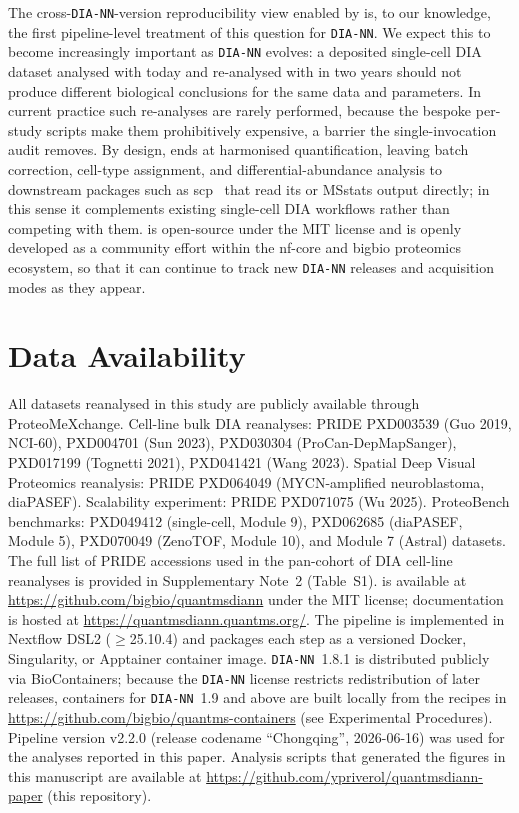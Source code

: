 \documentclass[preprint,12pt]{elsarticle}
\begin{document}
The cross-\texttt{DIA-NN}-version reproducibility view enabled by \quantmsdiann{} is, to our knowledge, the first pipeline-level treatment of this question for \texttt{DIA-NN}. We expect this to become increasingly important as \texttt{DIA-NN} evolves: a deposited single-cell DIA dataset analysed with  today and re-analysed with  in two years should not produce different biological conclusions for the same data and parameters. In current practice such re-analyses are rarely performed, because the bespoke per-study scripts make them prohibitively expensive, a barrier the single-invocation audit removes. By design, \quantmsdiann{} ends at harmonised quantification, leaving batch correction, cell-type assignment, and differential-abundance analysis to downstream packages such as scp~\cite{vanderaa2023} that read its \qpx{} or MSstats output directly; in this sense it complements existing single-cell DIA workflows rather than competing with them. \quantmsdiann{} is open-source under the MIT license and is openly developed as a community effort within the nf-core and bigbio proteomics ecosystem, so that it can continue to track new \texttt{DIA-NN} releases and acquisition modes as they appear.


\section*{Data Availability}
All datasets reanalysed in this study are publicly available through ProteoMeXchange.
Cell-line bulk DIA reanalyses: PRIDE PXD003539 (Guo 2019, NCI-60), PXD004701 (Sun 2023), PXD030304 (ProCan-DepMapSanger), PXD017199 (Tognetti 2021), PXD041421 (Wang 2023). Spatial Deep Visual Proteomics reanalysis: PRIDE PXD064049 (MYCN-amplified neuroblastoma, diaPASEF).
Scalability experiment: PRIDE PXD071075 (Wu 2025). ProteoBench benchmarks: PXD049412 (single-cell, Module 9), PXD062685 (diaPASEF, Module 5), PXD070049 (ZenoTOF, Module 10), and Module 7 (Astral) datasets. The full list of PRIDE accessions used in the pan-cohort of DIA cell-line reanalyses is provided in Supplementary Note~2 (Table~S1). \quantmsdiann{} is available at \url{https://github.com/bigbio/quantmsdiann} under the MIT license; documentation is hosted at \url{https://quantmsdiann.quantms.org/}.
The pipeline is implemented in Nextflow DSL2 ($\geq$25.10.4) and packages each step as a versioned Docker, Singularity, or Apptainer container image. \texttt{DIA-NN}~1.8.1 is distributed publicly via BioContainers; because the \texttt{DIA-NN} license restricts redistribution of later releases, containers for \texttt{DIA-NN}~1.9 and above are built locally from the recipes in \url{https://github.com/bigbio/quantms-containers} (see Experimental Procedures). Pipeline version v2.2.0 (release codename ``Chongqing'', 2026-06-16) was used for the analyses reported in this paper. Analysis scripts that generated the figures in this manuscript are available at \url{https://github.com/ypriverol/quantmsdiann-paper} (this repository).
\end{document}
